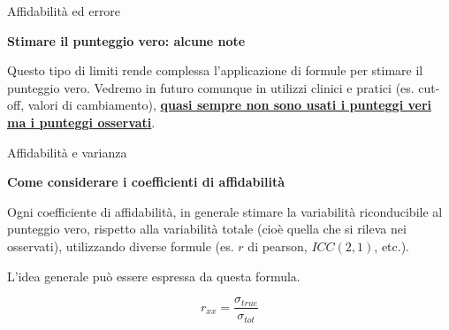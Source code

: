\documentclass[
  ignorenonframetext,
]{beamer}
\begin{document}
\begin{frame}{Affidabilità ed errore}
\label{affidabilituxe0-ed-errore-7}
\begin{center}
  \textbf{Stimare il punteggio vero: alcune note}
\end{center}

Questo tipo di limiti rende complessa l'applicazione di formule per
stimare il punteggio vero. Vedremo in futuro comunque in utilizzi
clinici e pratici (es. cut-off, valori di cambiamento),
\textbf{\underline{quasi sempre non sono usati i punteggi veri ma i punteggi osservati}}.
\end{frame}

\begin{frame}{Affidabilità e varianza}
\label{affidabilituxe0-e-varianza}
\begin{center}
  \textbf{Come considerare i coefficienti di affidabilità}
\end{center}

Ogni coefficiente di affidabilità, in generale stimare la variabilità
riconducibile al punteggio vero, rispetto alla variabilità totale (cioè
quella che si rileva nei osservati), utilizzando diverse formule (es.
\(r\) di pearson, \(ICC(2,1)\), etc.).

L'idea generale può essere espressa da questa formula.

\[
r_{xx} = \frac{\sigma_{true}}{\sigma_{tot}}
\]
\end{frame}
\end{document}
